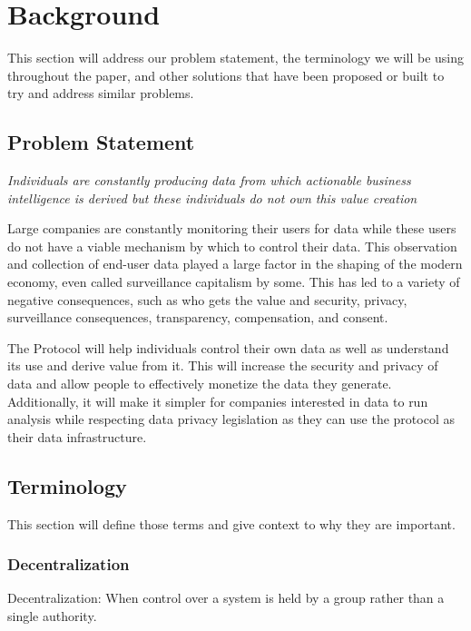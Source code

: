 \section{Background}

This section will address our problem statement, the terminology we will be using throughout the paper, and other solutions that have been proposed or built to try 
and address similar problems. 

\subsection{Problem Statement}


     

\textit{Individuals are constantly producing data from which actionable business intelligence is derived but these individuals do not own this value creation}
\newline
\newline

Large companies are constantly monitoring their users for data while these users do not have a viable mechanism by which to control their data. This observation 
and collection of end-user data played a large factor in the shaping of the modern economy, even called surveillance capitalism by some. This has led to a 
variety of negative consequences, such as who gets the value and security, privacy, surveillance consequences, transparency, compensation, and consent. 

The Protocol will help individuals control their own data as well as understand its use and derive value from it. This will increase the security 
and privacy of data and allow people to effectively monetize the data they generate. Additionally, it will make it simpler for companies interested in data to 
run analysis while respecting data privacy legislation as they can use the protocol as their data infrastructure.

\subsection{Terminology}

This section will define those terms and give context to why they are important.

\subsubsection{Decentralization}
\begin{definition}
\label{definition:Decentralization}
Decentralization: When control over a system is held by a group rather than a single authority.
\end{definition}

